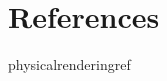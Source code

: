 \documentclass[preview]{standalone}
\begin{document}
\genpage

\nocite{*} %

\section{References}

\begin{snippet}{physicalrenderingref}
\printbibliography[heading=none]
\end{snippet}
\end{document}
